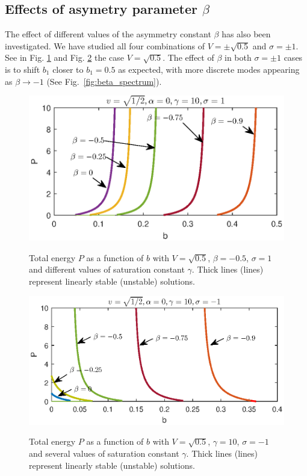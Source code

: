 \documentclass[aps,pre,showpacs,twocolumn]{revtex4}
\begin{document}
\subsection{Effects of asymetry parameter $\beta$}
The effect of different values of the asymmetry constant $\beta$ has also been investigated. We have studied all four combinations of $V=\pm\sqrt{0.5}$ and $\sigma=\pm 1$. See in Fig. \ref{fig:beta_branches_sigma1} and Fig. \ref{fig:branches_V05_sat10_c0_sigma-1} the case $V=\sqrt{0.5}$. The effect of $\beta$ in both $\sigma=\pm 1$ cases is to shift $b_1$ closer to $b_1=0.5$ as expected, with more discrete modes appearing as $\beta\to -1$ (See Fig.~\ref{fig:beta_spectrum}).
\begin{figure}[!htb]
\begin{center}
\scalebox{.6} {\includegraphics{branches_V05_sat10_c0_sigma1.eps}}
\end{center}
\caption{Total energy $P$ as a function of $b$ with $V=\sqrt{0.5}$, $\beta=-0.5$, $\sigma=1$ and different values of saturation constant $\gamma$. Thick lines (lines) represent linearly stable (unstable) solutions.}
\label{fig:beta_branches_sigma1}
\end{figure}
\begin{figure}[!htb]
\begin{center}
\scalebox{.6} {\includegraphics{branches_V05_sat10_c0_sigma-1.eps}}
\end{center}
\caption{Total energy $P$ as a function of $b$  with $V=\sqrt{0.5}$, $\gamma=10$, $\sigma=-1$ and several values of saturation constant $\gamma$. Thick lines (lines) represent linearly stable (unstable) solutions.}
\label{fig:branches_V05_sat10_c0_sigma-1}
\end{figure}
\end{document}
